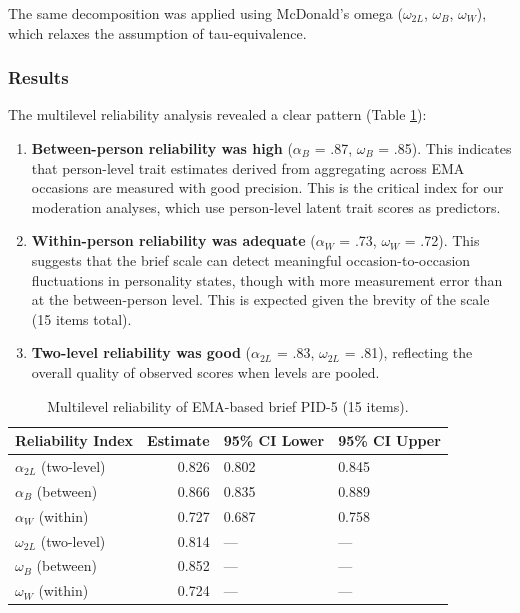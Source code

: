 \documentclass[
  english,
  man,floatsintext]{apa6}
\begin{document}
The same decomposition was applied using McDonald's omega (\(\omega_{2L}\), \(\omega_B\), \(\omega_W\)), which relaxes the assumption of tau-equivalence.

\subsubsection{Results}\label{results-1}

The multilevel reliability analysis revealed a clear pattern (Table \ref{tab:table-s2-ema-reliability}):

\begin{enumerate}
\def\labelenumi{\arabic{enumi}.}
\item
  \textbf{Between-person reliability was high} (\(\alpha_B\) = .87, \(\omega_B\) = .85). This indicates that person-level trait estimates derived from aggregating across EMA occasions are measured with good precision. This is the critical index for our moderation analyses, which use person-level latent trait scores as predictors.
\item
  \textbf{Within-person reliability was adequate} (\(\alpha_W\) = .73, \(\omega_W\) = .72). This suggests that the brief scale can detect meaningful occasion-to-occasion fluctuations in personality states, though with more measurement error than at the between-person level. This is expected given the brevity of the scale (15 items total).
\item
  \textbf{Two-level reliability was good} (\(\alpha_{2L}\) = .83, \(\omega_{2L}\) = .81), reflecting the overall quality of observed scores when levels are pooled.
\end{enumerate}

\begin{table}

\caption{\label{tab:table-s2-ema-reliability}Multilevel reliability of EMA-based brief PID-5 (15 items).}
\centering
\begin{tabular}[t]{lrll}
\toprule
Reliability Index & Estimate & 95\% CI Lower & 95\% CI Upper\\
\midrule
$\alpha_{2L}$ (two-level) & 0.826 & 0.802 & 0.845\\
$\alpha_B$ (between) & 0.866 & 0.835 & 0.889\\
$\alpha_W$ (within) & 0.727 & 0.687 & 0.758\\
$\omega_{2L}$ (two-level) & 0.814 & --- & ---\\
$\omega_B$ (between) & 0.852 & --- & ---\\
\addlinespace
$\omega_W$ (within) & 0.724 & --- & ---\\
\bottomrule
\end{tabular}
\end{table}
\end{document}
